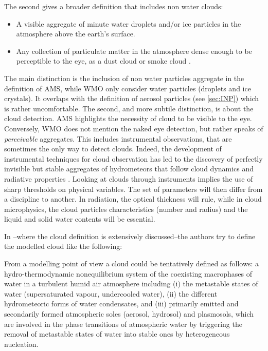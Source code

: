     The second gives a broader definition that includes non water clouds:
    \begin{displayquote}
        \begin{itemize}
            \item A visible aggregate of minute water droplets and/or ice particles in the atmosphere above the earth’s surface.            
            \item Any collection of particulate matter in the atmosphere dense enough to be perceptible to the eye, as a dust cloud or smoke cloud \citep{world_meteorological_organisation_international_2018}.
        \end{itemize}
    \end{displayquote}

    The main distinction is the inclusion of non water particles aggregate in the definition of AMS, while WMO only consider water particles (droplets and ice crystals). It overlaps with the definition of aerosol particles (see \cref{sec:INP}) which is rather uncomfortable.
    The second, and more subtile distinction, is about the cloud detection.
    AMS highlights the necessity of cloud to be visible to the eye. Conversely, WMO does not mention the naked eye detection, but rather speaks of \textit{perceivable} aggregates. 
    This includes instrumental observations, that are sometimes the only way to detect clouds. Indeed, the development of instrumental techniques for cloud observation has led to the discovery of perfectly invisible but stable aggregates of hydrometeors that follow cloud dynamics and radiative properties \citep{lesigne_extensive_2024}. 
    Looking at clouds through instruments implies the use of sharp thresholds on physical variables. The set of parameters will then differ from a discipline to another. In radiation, the optical thickness will rule, while in cloud microphysics, the cloud particles characteristics (number and radius) and the liquid and solid water contents will be essential.

    In \citet{spankuch_what_2022}\---where the cloud definition is extensively discussed\---the authors try to define the modelled cloud like the following:
    \begin{displayquote}
        From a modelling point of view a cloud could be tentatively defined as follows: a hydro-thermodynamic nonequilibrium system of the coexisting macrophases of water in a turbulent humid air atmosphere including (i) the metastable states of water (supersaturated vapour, undercooled water), (ii) the different hydrometeoric forms of water condensates, and (iii) primarily emitted and secondarily formed atmospheric soles (aerosol, hydrosol) and plasmosols, which are involved in the phase transitions of atmospheric water by triggering the removal of metastable states of water into stable ones by heterogeneous nucleation.
    \end{displayquote}

